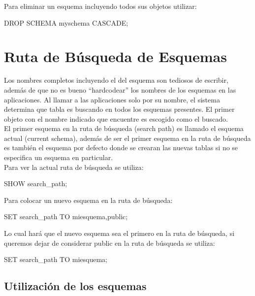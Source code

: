 Para eliminar un esquema incluyendo todos sus objetos utilizar:\\

\begin{pyglist}
DROP SCHEMA myschema CASCADE;
\end{pyglist}

\section{Ruta de Búsqueda de Esquemas}

Los nombres completos incluyendo el del esquema son tediosos de escribir, además de que no es bueno ``hardcodear'' los nombres de los esquemas en las aplicaciones. Al llamar a las aplicaciones solo por su nombre, el sistema determina que tabla es buscando en todos los esquemas presentes. El primer objeto con el nombre indicado que encuentre es escogido como el buscado.\\

El primer esquema en la ruta de búsqueda (search path) es llamado el esquema actual (current schema), además de ser el primer esquema en la ruta de búsqueda es también el esquema por defecto donde se crearan las nuevas tablas si no se especifica un esquema en particular.\\

Para ver la actual ruta de búsqueda se utiliza:\\

\begin{pyglist}
SHOW search_path;
\end{pyglist}

Para colocar un nuevo esquema en la ruta de búsqueda:\\

\begin{pyglist}
SET search_path TO miesquema,public;
\end{pyglist}

Lo cual hará que el nuevo esquema sea el primero en la ruta de búsqueda, si queremos dejar de considerar public en la ruta de búsqueda se utiliza:\\

\begin{pyglist}
SET search_path TO miesquema;
\end{pyglist}

\subsection{Utilización de los esquemas}

